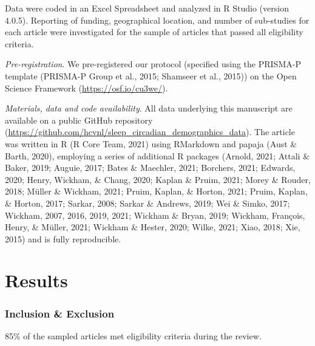 \documentclass[
  english,
  jou,floatsintext]{apa6}
\begin{document}
Data were coded in an Excel Spreadsheet and analyzed in R Studio (version 4.0.5). Reporting of funding, geographical location, and number of sub-studies for each article were investigated for the sample of articles that passed all eligibility criteria.

\emph{Pre-registration}. We pre-registered our protocol (specified using the PRISMA-P template (PRISMA-P Group et al., 2015; Shamseer et al., 2015)) on the Open Science Framework (\url{https://osf.io/cu3we/}).

\emph{Materials, data and code availability}. All data underlying this manuscript are available on a public GitHub repository (\url{https://github.com/hcvnl/sleep_circadian_demographics_data}). The article was written in R (R Core Team, 2021) using RMarkdown and papaja (Aust \& Barth, 2020), employing a series of additional R packages (Arnold, 2021; Attali \& Baker, 2019; Auguie, 2017; Bates \& Maechler, 2021; Borchers, 2021; Edwards, 2020; Henry, Wickham, \& Chang, 2020; Kaplan \& Pruim, 2021; Morey \& Rouder, 2018; Müller \& Wickham, 2021; Pruim, Kaplan, \& Horton, 2021; Pruim, Kaplan, \& Horton, 2017; Sarkar, 2008; Sarkar \& Andrews, 2019; Wei \& Simko, 2017; Wickham, 2007, 2016, 2019, 2021; Wickham \& Bryan, 2019; Wickham, François, Henry, \& Müller, 2021; Wickham \& Hester, 2020; Wilke, 2021; Xiao, 2018; Xie, 2015) and is fully reproducible.

\hypertarget{results}{%
\section{Results}\label{results}}

\hypertarget{inclusion-exclusion}{%
\subsubsection{Inclusion \& Exclusion}\label{inclusion-exclusion}}

85\% of the sampled articles met eligibility criteria during the review.
\end{document}
